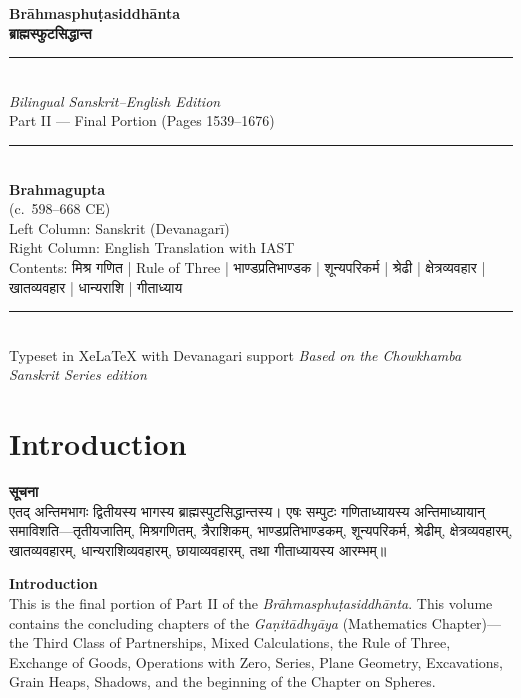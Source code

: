 \documentclass[10pt,a4paper]{article}
\newcommand{\dev}[1]{{\devanagarifont #1}}
\newcommand{\longline}{\noindent\rule{\textwidth}{0.4pt}}
\newcommand{\bilingual}[2]{%
  \noindent%
  \begin{minipage}[t]{0.47\textwidth}%
    \setstretch{1.15}#1%
  \end{minipage}%
  \hfill%
  \vrule\hfill%
  \begin{minipage}[t]{0.47\textwidth}%
    \setstretch{1.15}#2%
  \end{minipage}%
  \par\medskip
}
\begin{document}
\begin{titlepage}
\centering
\vspace*{1.5cm}
{\Huge\bfseries\color{titlecolor} Brāhmasphuṭasiddhānta}\\[0.6cm]
{\LARGE\bfseries\color{sectioncolor} \dev{ब्राह्मस्फुटसिद्धान्त}}\\[1.2cm]
\longline\\[0.6cm]
{\Large\textit{Bilingual Sanskrit--English Edition}}\\[0.3cm]
{\large Part II --- Final Portion (Pages 1539--1676)}\\[0.8cm]
\longline\\[1.2cm]
{\Large\textbf{Brahmagupta}}\\[0.3cm]
{\large (c.\ 598--668 CE)}\\[1cm]
{\large Left Column: Sanskrit (Devanagarī)}\\[0.2cm]
{\large Right Column: English Translation with IAST}\\[1.5cm]
{\normalsize Contents: \dev{मिश्र गणित} | Rule of Three | \dev{भाण्डप्रतिभाण्डक} | \dev{शून्यपरिकर्म} | \dev{श्रेढी} | \dev{क्षेत्रव्यवहार} | \dev{खातव्यवहार} | \dev{धान्यराशि} | \dev{गीताध्याय}}\\[0.5cm]
\longline\\[1cm]
{\small Typeset in XeLaTeX with Devanagari support}
\vfill
{\small\textit{Based on the Chowkhamba Sanskrit Series edition}}
\end{titlepage}

\tableofcontents
\newpage

\section*{Introduction}

\bilingual{%
\textbf{\large सूचना}\\[0.5em]
एतद् अन्तिमभागः द्वितीयस्य भागस्य ब्राह्मस्पुटसिद्धान्तस्य। एषः सम्पुटः गणिताध्यायस्य अन्तिमाध्यायान् समाविशति---तृतीयजातिम्, मिश्रगणितम्, त्रैराशिकम्, भाण्डप्रतिभाण्डकम्, शून्यपरिकर्म, श्रेढीम्, क्षेत्रव्यवहारम्, खातव्यवहारम्, धान्यराशिव्यवहारम्, छायाव्यवहारम्, तथा गीताध्यायस्य आरम्भम्॥
}{%
\textbf{\large Introduction}\\[0.5em]
This is the final portion of Part II of the \textit{Brāhmasphuṭasiddhānta}. This volume contains the concluding chapters of the \textit{Gaṇitādhyāya} (Mathematics Chapter)---the Third Class of Partnerships, Mixed Calculations, the Rule of Three, Exchange of Goods, Operations with Zero, Series, Plane Geometry, Excavations, Grain Heaps, Shadows, and the beginning of the Chapter on Spheres.
}
\end{document}
